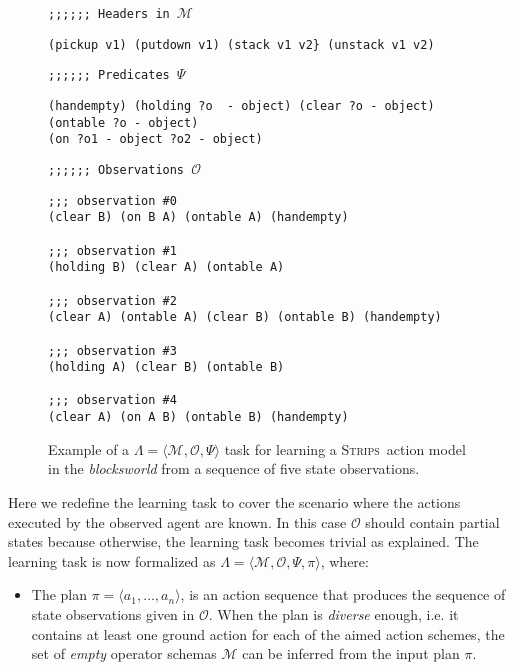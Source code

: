 \documentclass[3p,times]{elsarticle}
\newcommand{\strips}{\textsc{Strips}}     %
\newcommand{\tup}[1]{{\langle #1 \rangle}}
\begin{document}
\begin{figure}[hbt!]
{\footnotesize\tt ;;;;;; Headers in $\mathcal{M}$}
\begin{footnotesize}
\begin{verbatim}
(pickup v1) (putdown v1) (stack v1 v2} (unstack v1 v2)
\end{verbatim}
\end{footnotesize}
\vspace{0.2cm}
{\footnotesize\tt ;;;;;; Predicates $\Psi$}
\begin{footnotesize}
\begin{verbatim}
(handempty) (holding ?o  - object) (clear ?o - object) (ontable ?o - object)
(on ?o1 - object ?o2 - object)
\end{verbatim}
\end{footnotesize}
\vspace{0.2cm}
{\footnotesize\tt ;;;;;; Observations $\mathcal{O}$}
\begin{footnotesize}
\begin{verbatim}
;;; observation #0
(clear B) (on B A) (ontable A) (handempty)

;;; observation #1
(holding B) (clear A) (ontable A)

;;; observation #2
(clear A) (ontable A) (clear B) (ontable B) (handempty)

;;; observation #3
(holding A) (clear B) (ontable B)

;;; observation #4
(clear A) (on A B) (ontable B) (handempty)
\end{verbatim}
\end{footnotesize}
 \caption{\small Example of a $\Lambda=\tup{\mathcal{M},\mathcal{O},\Psi}$ task for learning a \strips\ action model in the {\em blocksworld} from a sequence of five state observations.}
\label{fig:example-observations}
\end{figure}

Here we redefine the learning task to cover the scenario where the actions executed by the observed agent are known. In this case $\mathcal{O}$ should contain partial states because otherwise, the learning task becomes trivial as explained. The learning task is now formalized as $\Lambda=\tup{\mathcal{M},\mathcal{O},\Psi,\pi}$, where:
\begin{itemize}
\item The plan $\pi=\tup{a_1, \ldots, a_n}$, is an action sequence that produces the sequence of state observations given in $\mathcal{O}$. When the plan is {\em diverse} enough, i.e. it contains at least one ground action for each of the aimed action schemes, the set of {\em empty} operator schemas $\mathcal{M}$ can be inferred from the input plan $\pi$.
\end{itemize}
\end{document}
